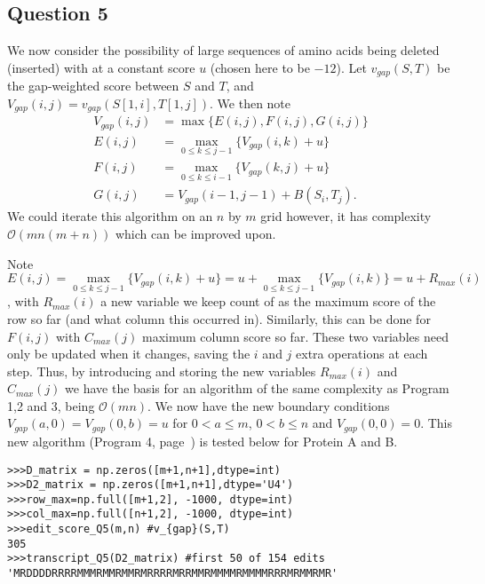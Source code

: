 \documentclass{article}
\begin{document}
\subsection{Question 5}
\vspace{-0.3cm}

We now consider the possibility of large sequences of amino acids being deleted (inserted) with at a constant score $u$ (chosen here to be $-12$). Let $v_{gap}(S,T)$ be the gap-weighted score between $S$ and $T$, and $V_{gap}(i,j)= v_{gap}(S[1,i],T[1,j])$. We then note
\begin{equation*}
\begin{split}
V_{gap}(i,j) &= \max \{ E(i,j),F(i,j),G(i,j) \} \\
E(i,j) &= \underset{0\leq k \leq j-1}{\max} \{ V_{gap}(i,k) + u \} \\
F(i,j) &= \underset{0\leq k \leq i-1}{\max} \{V_{gap}(k,j)+ u \} \\
G(i,j) &= V_{gap}(i-1,j-1)+B(S_i,T_j).
\end{split}
\end{equation*}
We could iterate this algorithm on an $n$ by $m$ grid however, it has complexity $\mathcal{O}(mn(m+n))$ which can be improved upon. 

Note $E(i,j) = \underset{0\leq k \leq j-1}{\max} \{ V_{gap}(i,k) + u \} = u + \underset{0\leq k \leq j-1}{\max} \{ V_{gap}(i,k)\}=u+R_{max}(i)$, with $R_{max}(i)$  a new variable we keep count of as the maximum score of the row so far (and what column this occurred in). Similarly, this can be done for $F(i,j)$ with $C_{max}(j)$ maximum column score so far. These two variables need only be updated when it changes, saving the $i$ and $j$ extra operations at each step. Thus, by introducing and storing the new variables $R_{max}(i)$ and $C_{max}(j)$ we have the basis for an algorithm of the same complexity as Program 1,2 and 3, being $\mathcal{O}(mn)$. We now have the new boundary conditions $V_{gap}(a,0)=V_{gap}(0,b)=u$ for $0 < a \leq m$, $0 < b \leq n$ and $V_{gap}(0,0)=0$. This new algorithm (Program 4, page~\pageref{subsec:Program 4}) is tested below for Protein A and B.

\begin{lstlisting}
>>>D_matrix = np.zeros([m+1,n+1],dtype=int)
>>>D2_matrix = np.zeros([m+1,n+1],dtype='U4')
>>>row_max=np.full([m+1,2], -1000, dtype=int)
>>>col_max=np.full([n+1,2], -1000, dtype=int)
>>>edit_score_Q5(m,n) #v_{gap}(S,T)
305
>>>transcript_Q5(D2_matrix) #first 50 of 154 edits
'MRDDDDRRRRMMMRMMRMMRMRRRRMRRMMRMMMMRMMMMRRRMRMMRMR'
\end{lstlisting}
\vspace{-0.5cm}
\end{document}
